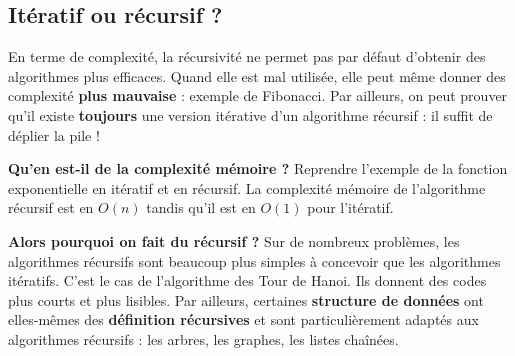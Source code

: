 \documentclass{../cours}
\begin{document}
\subsection{Itératif ou récursif ?}

En terme de complexité, la récursivité ne permet pas par défaut d'obtenir des algorithmes plus efficaces. Quand elle est mal utilisée, elle peut même donner des complexité \textbf{plus mauvaise} : exemple de Fibonacci. Par ailleurs, on peut prouver qu'il existe \textbf{toujours} une version itérative d'un algorithme récursif : il suffit de déplier la pile !

\textbf{Qu'en est-il de la complexité mémoire ?} Reprendre l'exemple de la fonction exponentielle en itératif et en récursif. La complexité mémoire de l'algorithme récursif est en $O(n)$ tandis qu'il est en $O(1)$ pour l'itératif.

\textbf{Alors pourquoi on fait du récursif ?} Sur de nombreux problèmes, les algorithmes récursifs sont beaucoup plus simples à concevoir que les algorithmes itératifs. C'est le cas de l'algorithme des Tour de Hanoi. Ils donnent des codes plus courts et plus lisibles. Par ailleurs, certaines \textbf{structure de données} ont elles-mêmes des \textbf{définition récursives} et sont particulièrement adaptés aux algorithmes récursifs : les arbres, les graphes, les listes chaînées. 
\end{document}
